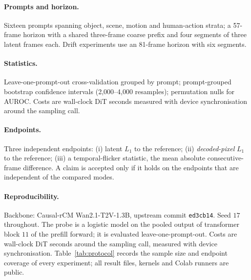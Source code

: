 \documentclass[review]{cas-sc}          %
\begin{document}
\paragraph{Prompts and horizon.}
Sixteen prompts spanning object, scene, motion and human-action strata; a 57-frame horizon with a shared
three-frame coarse prefix and four segments of three latent frames each. Drift experiments use an
81-frame horizon with six segments.

\paragraph{Statistics.}
Leave-one-prompt-out cross-validation grouped by prompt; prompt-grouped bootstrap confidence intervals
(2{,}000--4{,}000 resamples); permutation nulls for AUROC. Costs are wall-clock DiT seconds measured with
device synchronisation around the sampling call.

\paragraph{Endpoints.}
Three independent endpoints: (i) latent $L_1$ to the reference; (ii) \emph{decoded-pixel} $L_1$ to the
reference; (iii) a temporal-flicker statistic, the mean absolute consecutive-frame difference. A claim
is accepted only if it holds on the endpoints that are independent of the compared modes.

\paragraph{Reproducibility.}
Backbone: Causal-rCM Wan2.1-T2V-1.3B, upstream commit \texttt{ed3cb14}. Seed $17$ throughout. The probe
is a logistic model on the pooled output of transformer block $11$ of the prefill forward; it is
evaluated leave-one-prompt-out. Costs are wall-clock DiT seconds around the sampling call, measured with
device synchronisation. Table~\ref{tab:protocol} records the sample size and endpoint coverage of every
experiment; all result files, kernels and Colab runners are public.
\end{document}
